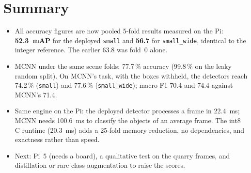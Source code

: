 \documentclass[11pt,a4paper]{article}
\newcommand{\cfg}[1]{\texttt{#1}}
\begin{document}
\section{Summary}

\begin{itemize}
  \item All accuracy figures are now pooled 5-fold results measured on the
        Pi: \textbf{52.3~mAP} for the deployed \cfg{small} and \textbf{56.7}
        for \cfg{small\_wide}, identical to the integer reference. The
        earlier 63.8 was fold~0 alone.
  \item MCNN under the same scene folds: 77.7\,\% accuracy (99.8\,\% on the
        leaky random split). On MCNN's task, with the boxes withheld, the
        detectors reach 74.2\,\% (\cfg{small}) and 77.6\,\%
        (\cfg{small\_wide}); macro-F1 70.4 and 74.4 against MCNN's 71.4.
  \item Same engine on the Pi: the deployed detector processes a frame in
        22.4~ms; MCNN needs 100.6~ms to classify the objects of an average
        frame. The int8 C runtime (20.3~ms) adds a 25-fold memory reduction,
        no dependencies, and exactness rather than speed.
  \item Next: Pi~5 (needs a board), a qualitative test on the quarry frames,
        and distillation or rare-class augmentation to raise the scores.
\end{itemize}
\end{document}
